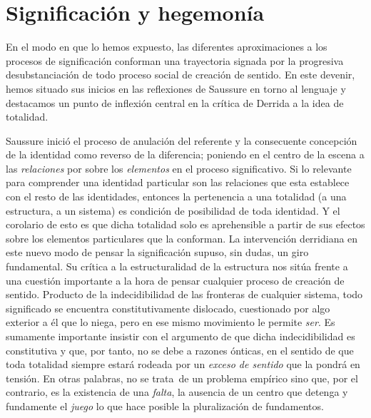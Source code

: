 \section{Significación y hegemonía}

En el modo en que lo hemos expuesto, las diferentes aproximaciones a los procesos de significación conforman una trayectoria signada por la progresiva desubstanciación de todo proceso social de creación de sentido. En este devenir, hemos situado sus inicios en las reflexiones de Saussure en torno al lenguaje y destacamos un punto de inflexión central en la crítica de Derrida a la idea de totalidad.

Saussure inició el proceso de anulación del referente y la consecuente concepción de la identidad como reverso de la diferencia; poniendo en el centro de la escena a las \emph{relaciones} por sobre los \emph{elementos} en el proceso significativo. Si lo relevante para comprender una identidad particular son las relaciones que esta establece con el resto de las identidades, entonces la pertenencia a una totalidad (a una estructura, a un sistema) es condición de posibilidad de toda identidad. Y el corolario de esto es que dicha totalidad solo es aprehensible a partir de sus efectos sobre los elementos particulares que la conforman. La intervención derridiana en este nuevo modo de pensar la significación supuso, sin dudas, un giro fundamental. Su crítica a la estructuralidad de la estructura nos sitúa frente a una cuestión importante a la hora de pensar cualquier proceso de creación de sentido. Producto de la indecidibilidad de las fronteras de cualquier sistema, todo significado se encuentra constitutivamente dislocado, cuestionado por algo exterior a él que lo niega, pero en ese mismo movimiento le permite \emph{ser}. Es sumamente importante insistir con el argumento de que dicha indecidibilidad es constitutiva y que, por tanto, no se debe a razones ónticas, en el sentido de que toda totalidad siempre estará rodeada por un \emph{exceso de sentido} que la pondrá en tensión. En otras palabras, no se trata~de un problema empírico sino que, por el contrario, es la existencia de una \emph{falta}, la ausencia de un centro que detenga y fundamente el \emph{juego} lo que hace posible la pluralización de fundamentos.

